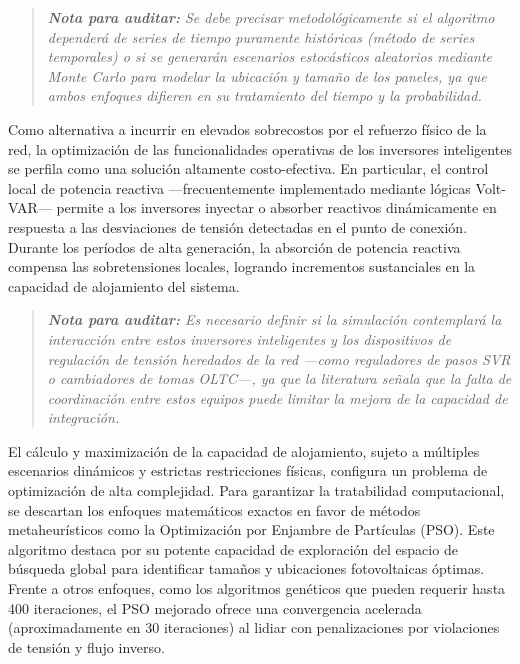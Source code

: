 \begin{quote}
\small \textit{\textbf{Nota para auditar:} Se debe precisar metodológicamente si el algoritmo dependerá de series de tiempo puramente históricas (método de series temporales) o si se generarán escenarios estocásticos aleatorios mediante Monte Carlo para modelar la ubicación y tamaño de los paneles, ya que ambos enfoques difieren en su tratamiento del tiempo y la probabilidad.}
\end{quote}

Como alternativa a incurrir en elevados sobrecostos por el refuerzo físico de la red, la optimización de las funcionalidades operativas de los inversores inteligentes se perfila como una solución altamente costo-efectiva. En particular, el control local de potencia reactiva ---frecuentemente implementado mediante lógicas Volt-VAR--- permite a los inversores inyectar o absorber reactivos dinámicamente en respuesta a las desviaciones de tensión detectadas en el punto de conexión. Durante los períodos de alta generación, la absorción de potencia reactiva compensa las sobretensiones locales, logrando incrementos sustanciales en la capacidad de alojamiento del sistema.

\begin{quote}
\small \textit{\textbf{Nota para auditar:} Es necesario definir si la simulación contemplará la interacción entre estos inversores inteligentes y los dispositivos de regulación de tensión heredados de la red ---como reguladores de pasos SVR o cambiadores de tomas OLTC---, ya que la literatura señala que la falta de coordinación entre estos equipos puede limitar la mejora de la capacidad de integración.}
\end{quote}

El cálculo y maximización de la capacidad de alojamiento, sujeto a múltiples escenarios dinámicos y estrictas restricciones físicas, configura un problema de optimización de alta complejidad. Para garantizar la tratabilidad computacional, se descartan los enfoques matemáticos exactos en favor de métodos metaheurísticos como la Optimización por Enjambre de Partículas (PSO). Este algoritmo destaca por su potente capacidad de exploración del espacio de búsqueda global para identificar tamaños y ubicaciones fotovoltaicas óptimas. Frente a otros enfoques, como los algoritmos genéticos que pueden requerir hasta 400 iteraciones, el PSO mejorado ofrece una convergencia acelerada (aproximadamente en 30 iteraciones) al lidiar con penalizaciones por violaciones de tensión y flujo inverso.

